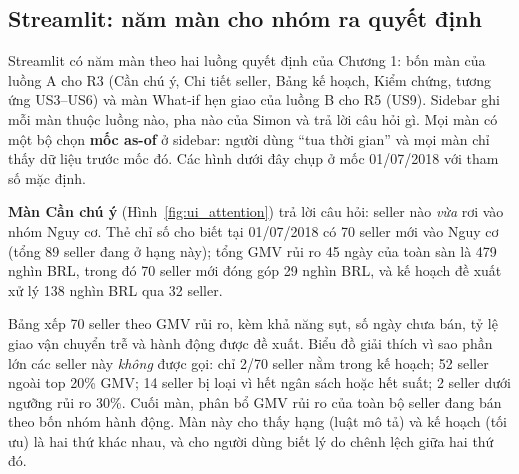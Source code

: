\subsection{Streamlit: năm màn cho nhóm ra quyết định}
Streamlit có năm màn theo hai luồng quyết định của Chương 1: bốn màn của luồng A cho R3 (Cần chú ý, Chi tiết seller, Bảng kế hoạch, Kiểm chứng, tương ứng US3--US6) và màn What-if hẹn giao của luồng B cho R5 (US9). Sidebar ghi mỗi màn thuộc luồng nào, pha nào của Simon và trả lời câu hỏi gì.
Mọi màn có một bộ chọn \textbf{mốc as-of} ở sidebar: người dùng ``tua thời gian'' và mọi màn chỉ thấy dữ liệu trước mốc đó. Các hình dưới đây chụp ở mốc 01/07/2018 với tham số mặc định.


\textbf{Màn Cần chú ý} (Hình~\ref{fig:ui_attention}) trả lời câu hỏi: seller nào \emph{vừa} rơi vào nhóm Nguy cơ. Thẻ chỉ số  cho biết tại 01/07/2018 có 70 seller mới vào Nguy cơ (tổng 89 seller đang ở hạng này); tổng GMV rủi ro 45 ngày của toàn sàn là 479 nghìn BRL, trong đó 70 seller mới đóng góp 29 nghìn BRL, và kế hoạch đề xuất xử lý 138 nghìn BRL qua 32 seller.

Bảng  xếp 70 seller theo GMV rủi ro, kèm khả năng sụt, số ngày chưa bán, tỷ lệ giao vận chuyển trễ và hành động được đề xuất. Biểu đồ  giải thích vì sao phần lớn các seller này \emph{không} được gọi: chỉ 2/70 seller nằm trong kế hoạch; 52 seller ngoài top 20\% GMV; 14 seller bị loại vì hết ngân sách hoặc hết suất; 2 seller dưới ngưỡng rủi ro 30\%. Cuối màn,  phân bổ GMV rủi ro của toàn bộ seller đang bán theo bốn nhóm hành động. Màn này cho thấy hạng (luật mô tả) và kế hoạch (tối ưu) là hai thứ khác nhau, và cho người dùng biết lý do chênh lệch giữa hai thứ đó.


